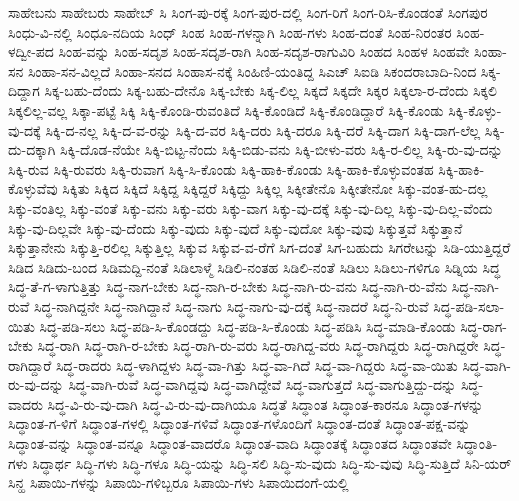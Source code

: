 {ಸಾಹೇಬನು
ಸಾಹೇಬರು
ಸಾಹೇಬ್
ಸಿ
ಸಿಂಗ-ಪು-ರಕ್ಕೆ
ಸಿಂಗ-ಪುರ-ದಲ್ಲಿ
ಸಿಂಗ-ರಿಗೆ
ಸಿಂಗ-ರಿಸಿ-ಕೊಂಡಂತೆ
ಸಿಂಗಪುರ
ಸಿಂಧು-ವಿ-ನಲ್ಲಿ
ಸಿಂಧೂ-ನದಿಯ
ಸಿಂಧ್
ಸಿಂಹ
ಸಿಂಹ-ಗಳನ್ನಾಗಿ
ಸಿಂಹ-ಗಳು
ಸಿಂಹ-ದಂತೆ
ಸಿಂಹ-ನಿರಂತರ
ಸಿಂಹ-ಳದ್ವೀ-ಪದ
ಸಿಂಹ-ವನ್ನು
ಸಿಂಹ-ಸದೃಶ
ಸಿಂಹ-ಸದೃಶ-ರಾಗಿ
ಸಿಂಹ-ಸದೃಶ-ರಾಗುವಿರಿ
ಸಿಂಹದ
ಸಿಂಹಳ
ಸಿಂಹವೇ
ಸಿಂಹಾ-ಸನ
ಸಿಂಹಾ-ಸನ-ವಿಲ್ಲದೆ
ಸಿಂಹಾ-ಸನದ
ಸಿಂಹಾಸ-ನಕ್ಕೆ
ಸಿಂಹಿಣಿ-ಯಂತಿದ್ದ
ಸಿಎಚ್
ಸಿಐಡಿ
ಸಿಕಂದರಾಬಾದಿ-ನಿಂದ
ಸಿಕ್ಕ-ದಿದ್ದಾಗ
ಸಿಕ್ಕ-ಬಹು-ದೆಂದು
ಸಿಕ್ಕ-ಬಹು-ದೇನೊ
ಸಿಕ್ಕ-ಬೇಕು
ಸಿಕ್ಕ-ಲಿಲ್ಲ
ಸಿಕ್ಕದೆ
ಸಿಕ್ಕದೇ
ಸಿಕ್ಕರ
ಸಿಕ್ಕಲಾ-ರ-ದೆಂದು
ಸಿಕ್ಕಲಿ
ಸಿಕ್ಕಲಿಲ್ಲ-ವಲ್ಲ
ಸಿಕ್ಕಾ-ಪಟ್ಟೆ
ಸಿಕ್ಕಿ
ಸಿಕ್ಕಿ-ಕೊಂಡಿ-ರುವಂತಿದೆ
ಸಿಕ್ಕಿ-ಕೊಂಡಿದೆ
ಸಿಕ್ಕಿ-ಕೊಂಡಿದ್ದಾರೆ
ಸಿಕ್ಕಿ-ಕೊಂಡು
ಸಿಕ್ಕಿ-ಕೊಳ್ಳು-ವು-ದಕ್ಕೆ
ಸಿಕ್ಕಿ-ದ-ನಲ್ಲ
ಸಿಕ್ಕಿ-ದ-ವ-ರನ್ನು
ಸಿಕ್ಕಿ-ದ-ವರ
ಸಿಕ್ಕಿ-ದರು
ಸಿಕ್ಕಿ-ದರೂ
ಸಿಕ್ಕಿ-ದರೆ
ಸಿಕ್ಕಿ-ದಾಗ
ಸಿಕ್ಕಿ-ದಾಗ-ಲೆಲ್ಲ
ಸಿಕ್ಕಿ-ದು-ದಕ್ಕಾಗಿ
ಸಿಕ್ಕಿ-ದೊಡ-ನೆಯೇ
ಸಿಕ್ಕಿ-ಬಿಟ್ಟ-ನೆಂದು
ಸಿಕ್ಕಿ-ಬಿಡು-ವನು
ಸಿಕ್ಕಿ-ಬೀಳು-ವರು
ಸಿಕ್ಕಿ-ರ-ಲಿಲ್ಲ
ಸಿಕ್ಕಿ-ರು-ವು-ದನ್ನು
ಸಿಕ್ಕಿ-ರುವ
ಸಿಕ್ಕಿ-ರುವರು
ಸಿಕ್ಕಿ-ರುವಾಗ
ಸಿಕ್ಕಿ-ಸಿ-ಕೊಂಡು
ಸಿಕ್ಕಿ-ಹಾಕಿ-ಕೊಂಡು
ಸಿಕ್ಕಿ-ಹಾಕಿ-ಕೊಳ್ಳುವಂತಹ
ಸಿಕ್ಕಿ-ಹಾಕಿ-ಕೊಳ್ಳುವೆವು
ಸಿಕ್ಕಿತು
ಸಿಕ್ಕಿದ
ಸಿಕ್ಕಿದೆ
ಸಿಕ್ಕಿದ್ದ
ಸಿಕ್ಕಿದ್ದರೆ
ಸಿಕ್ಕಿದ್ದು
ಸಿಕ್ಕಿಲ್ಲ
ಸಿಕ್ಕೀತೇನೊ
ಸಿಕ್ಕೀತೇನೋ
ಸಿಕ್ಕು-ವಂತ-ಹು-ದಲ್ಲ
ಸಿಕ್ಕು-ವಂತಿಲ್ಲ
ಸಿಕ್ಕು-ವಂತೆ
ಸಿಕ್ಕು-ವನು
ಸಿಕ್ಕು-ವರು
ಸಿಕ್ಕು-ವಾಗ
ಸಿಕ್ಕು-ವು-ದಕ್ಕೆ
ಸಿಕ್ಕು-ವು-ದಿಲ್ಲ
ಸಿಕ್ಕು-ವು-ದಿಲ್ಲ-ವೆಂದು
ಸಿಕ್ಕು-ವು-ದಿಲ್ಲವೇ
ಸಿಕ್ಕು-ವು-ದೆಂದು
ಸಿಕ್ಕು-ವುದು
ಸಿಕ್ಕು-ವುದೆ
ಸಿಕ್ಕು-ವುದೋ
ಸಿಕ್ಕು-ವುವು
ಸಿಕ್ಕುತ್ತವೆ
ಸಿಕ್ಕುತ್ತಾನೆ
ಸಿಕ್ಕುತ್ತಾನೇನು
ಸಿಕ್ಕುತ್ತಿ-ರಲಿಲ್ಲ
ಸಿಕ್ಕುತ್ತಿಲ್ಲ
ಸಿಕ್ಕುವ
ಸಿಕ್ಕುವ-ವ-ರೆಗೆ
ಸಿಗ-ದಂತೆ
ಸಿಗ-ಬಹುದು
ಸಿಗರೇಟನ್ನು
ಸಿಡಿ-ಯುತ್ತಿದ್ದರೆ
ಸಿಡಿದ
ಸಿಡಿದು-ಬಂದ
ಸಿಡಿಮದ್ದಿ-ನಂತೆ
ಸಿಡಿಲಾಳ್ಮೆ
ಸಿಡಿಲಿ-ನಂತಹ
ಸಿಡಿಲಿ-ನಂತೆ
ಸಿಡಿಲು
ಸಿಡಿಲು-ಗಳಿಗೂ
ಸಿಡ್ನಿಯ
ಸಿದ್ಧ
ಸಿದ್ಧ-ತೆ-ಗ-ಳಾಗುತ್ತಿತ್ತು
ಸಿದ್ಧ-ನಾಗ-ಬೇಕು
ಸಿದ್ಧ-ನಾಗಿ-ರ-ಬೇಕು
ಸಿದ್ಧ-ನಾಗಿ-ರು-ವನು
ಸಿದ್ಧ-ನಾಗಿ-ರು-ವೆನು
ಸಿದ್ಧ-ನಾಗಿ-ರುವೆ
ಸಿದ್ಧ-ನಾಗಿದ್ದನೇ
ಸಿದ್ಧ-ನಾಗಿದ್ದಾನೆ
ಸಿದ್ಧ-ನಾಗು
ಸಿದ್ಧ-ನಾಗು-ವು-ದಕ್ಕೆ
ಸಿದ್ಧ-ನಾದರೆ
ಸಿದ್ಧ-ನಿ-ರುವೆ
ಸಿದ್ಧ-ಪಡಿ-ಸಲಾ-ಯಿತು
ಸಿದ್ಧ-ಪಡಿ-ಸಲು
ಸಿದ್ಧ-ಪಡಿ-ಸಿ-ಕೊಂಡದ್ದು
ಸಿದ್ಧ-ಪಡಿ-ಸಿ-ಕೊಂಡು
ಸಿದ್ಧ-ಪಡಿಸಿ
ಸಿದ್ಧ-ಮಾಡಿ-ಕೊಂಡು
ಸಿದ್ಧ-ರಾಗ-ಬೇಕು
ಸಿದ್ಧ-ರಾಗಿ
ಸಿದ್ಧ-ರಾಗಿ-ರ-ಬೇಕು
ಸಿದ್ಧ-ರಾಗಿ-ರು-ವರು
ಸಿದ್ಧ-ರಾಗಿದ್ದ-ವರು
ಸಿದ್ಧ-ರಾಗಿದ್ದರು
ಸಿದ್ಧ-ರಾಗಿದ್ದರೇ
ಸಿದ್ಧ-ರಾಗಿದ್ದಾರೆ
ಸಿದ್ಧ-ರಾದರು
ಸಿದ್ಧ-ಳಾಗಿದ್ದಳು
ಸಿದ್ಧ-ವಾ-ಗಿತ್ತು
ಸಿದ್ಧ-ವಾ-ಗಿದೆ
ಸಿದ್ಧ-ವಾ-ಗಿದ್ದರು
ಸಿದ್ಧ-ವಾ-ಯಿತು
ಸಿದ್ಧ-ವಾಗಿ-ರು-ವು-ದನ್ನು
ಸಿದ್ಧ-ವಾಗಿ-ರುವೆ
ಸಿದ್ಧ-ವಾಗಿದ್ದವು
ಸಿದ್ಧ-ವಾಗಿದ್ದೇವೆ
ಸಿದ್ಧ-ವಾಗುತ್ತದೆ
ಸಿದ್ಧ-ವಾಗುತ್ತಿದ್ದು-ದನ್ನು
ಸಿದ್ಧ-ವಾದರು
ಸಿದ್ಧ-ವಿ-ರು-ವು-ದಾಗಿ
ಸಿದ್ಧ-ವಿ-ರು-ವು-ದಾಗಿಯೂ
ಸಿದ್ಧತೆ
ಸಿದ್ಧಾಂತ
ಸಿದ್ಧಾಂತ-ಕಾರನೂ
ಸಿದ್ಧಾಂತ-ಗಳನ್ನು
ಸಿದ್ಧಾಂತ-ಗ-ಳಿಗೆ
ಸಿದ್ಧಾಂತ-ಗಳಲ್ಲಿ
ಸಿದ್ಧಾಂತ-ಗಳಿವೆ
ಸಿದ್ಧಾಂತ-ಗಳೊಂದಿಗೆ
ಸಿದ್ಧಾಂತ-ದಂತೆ
ಸಿದ್ಧಾಂತ-ಪಕ್ಷ-ವನ್ನು
ಸಿದ್ಧಾಂತ-ವನ್ನು
ಸಿದ್ಧಾಂತ-ವನ್ನೂ
ಸಿದ್ಧಾಂತ-ವಾದರೊ
ಸಿದ್ಧಾಂತ-ವಾದಿ
ಸಿದ್ಧಾಂತಕ್ಕೆ
ಸಿದ್ಧಾಂತದ
ಸಿದ್ಧಾಂತವೇ
ಸಿದ್ಧಾಂತಿ-ಗಳು
ಸಿದ್ಧಾರ್ಥ
ಸಿದ್ಧಿ-ಗಳು
ಸಿದ್ಧಿ-ಗಳೂ
ಸಿದ್ಧಿ-ಯನ್ನು
ಸಿದ್ಧಿ-ಸಲಿ
ಸಿದ್ಧಿ-ಸು-ವುದು
ಸಿದ್ಧಿ-ಸು-ವುವು
ಸಿದ್ಧಿ-ಸುತ್ತಿದೆ
ಸಿನಿ-ಯರ್
ಸಿನ್ಹ
ಸಿಪಾಯಿ-ಗಳನ್ನು
ಸಿಪಾಯಿ-ಗಳಿಬ್ಬರೂ
ಸಿಪಾಯಿ-ಗಳು
ಸಿಪಾಯಿದಂಗೆ-ಯಲ್ಲಿ
}
